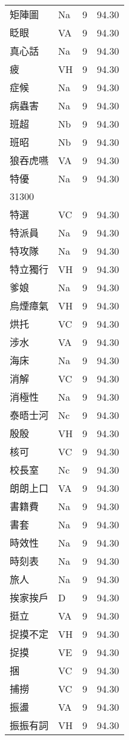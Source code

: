 \documentclass[twocolumn]{book}
\begin{document}
\begin{supertabular}{llrr}
矩陣圖 & Na & 9 &  94.30\\
眨眼 & VA & 9 &  94.30\\
真心話 & Na & 9 &  94.30\\
疲 & VH & 9 &  94.30\\
症候 & Na & 9 &  94.30\\
病蟲害 & Na & 9 &  94.30\\
班超 & Nb & 9 &  94.30\\
班昭 & Nb & 9 &  94.30\\
狼吞虎嚥 & VA & 9 &  94.30\\
特優 & Na & 9 &  94.30\\
31300\\
特選 & VC & 9 &  94.30\\
特派員 & Na & 9 &  94.30\\
特攻隊 & Na & 9 &  94.30\\
特立獨行 & VH & 9 &  94.30\\
爹娘 & Na & 9 &  94.30\\
烏煙瘴氣 & VH & 9 &  94.30\\
烘托 & VC & 9 &  94.30\\
涉水 & VA & 9 &  94.30\\
海床 & Na & 9 &  94.30\\
消解 & VC & 9 &  94.30\\
消極性 & Na & 9 &  94.30\\
泰晤士河 & Nc & 9 &  94.30\\
殷殷 & VH & 9 &  94.30\\
核可 & VC & 9 &  94.30\\
校長室 & Nc & 9 &  94.30\\
朗朗上口 & VA & 9 &  94.30\\
書籍費 & Na & 9 &  94.30\\
書套 & Na & 9 &  94.30\\
時效性 & Na & 9 &  94.30\\
時刻表 & Na & 9 &  94.30\\
旅人 & Na & 9 &  94.30\\
挨家挨戶 & D & 9 &  94.30\\
挺立 & VA & 9 &  94.30\\
捉摸不定 & VH & 9 &  94.30\\
捉摸 & VE & 9 &  94.30\\
捆 & VC & 9 &  94.30\\
捕撈 & VC & 9 &  94.30\\
振盪 & VA & 9 &  94.30\\
振振有詞 & VH & 9 &  94.30\\

\end{supertabular}
\end{document}
